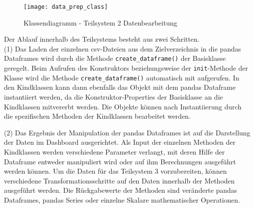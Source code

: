     \begin{sidewaysfigure}

        \centering
            \texttt{[image: data\_prep\_class]}
            \caption{Klassendiagramm - Teilsystem 2 Datenbearbeitung}
            \label{fig:classes data_prep}
    \end{sidewaysfigure}

    Der Ablauf innerhalb des Teilsystems besteht aus zwei Schritten.\\
    (1) Das Laden der einzelnen csv-Dateien aus dem Zielverzeichnis in die pandas Dataframes wird durch die Methode \texttt{create\_dataframe()} der Basisklasse geregelt.
    Beim Aufrufen des Konstruktors beziehungsweise der \texttt{init}-Methode der Klasse wird die Methode \texttt{create\_dataframe()} 
    automatisch mit aufgerufen. In den Kindklassen kann dann ebenfalls das Objekt mit dem pandas Dataframe instantiiert werden, da die Konstruktor-Properties der Basisklasse 
    an die Kindklassen mitvererbt werden. Die Objekte können nach Instantiierung durch die spezifischen Methoden der Kindklassen bearbeitet werden.
    
    (2) Das Ergebnis der Manipulation der pandas Dataframes ist auf die Darstellung der Daten im Dashboard ausgerichtet. Als Input der einzelnen Methoden der
    Kindklassen werden verschiedene Parameter verlangt, mit deren Hilfe der Dataframe entweder manipuliert wird oder auf ihm Berechnungen ausgeführt werden können. 
    Um die Daten für das Teilsystem 3 vorzubereiten, können verschiedene Transformationsschritte auf den Daten innerhalb der Methoden ausgeführt werden. 
    Die Rückgabewerte der Methoden sind veränderte pandas Dataframes, pandas Series oder einzelne Skalare mathematischer Operationen.
    
    

        
